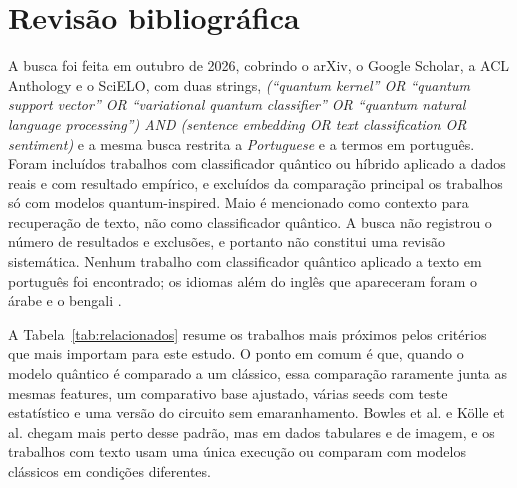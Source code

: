 \documentclass[conference]{IEEEtran}
\begin{document}
\section{Revisão bibliográfica}
\label{sec:revisao}

A busca foi feita em outubro de 2026, cobrindo o arXiv, o Google Scholar, a ACL Anthology e o SciELO, com duas strings, \textit{(``quantum kernel'' OR ``quantum support vector'' OR ``variational quantum classifier'' OR ``quantum natural language processing'') AND (sentence embedding OR text classification OR sentiment)} e a mesma busca restrita a \textit{Portuguese} e a termos em português. Foram incluídos trabalhos com classificador quântico ou híbrido aplicado a dados reais e com resultado empírico, e excluídos da comparação principal os trabalhos só com modelos quantum-inspired. Maio \cite{maio2026} é mencionado como contexto para recuperação de texto, não como classificador quântico. A busca não registrou o número de resultados e exclusões, e portanto não constitui uma revisão sistemática. Nenhum trabalho com classificador quântico aplicado a texto em português foi encontrado; os idiomas além do inglês que apareceram foram o árabe \cite{djemmal2025arabert} e o bengali \cite{masum2023}.

A Tabela~\ref{tab:relacionados} resume os trabalhos mais próximos pelos critérios que mais importam para este estudo. O ponto em comum é que, quando o modelo quântico é comparado a um clássico, essa comparação raramente junta as mesmas features, um comparativo base ajustado, várias seeds com teste estatístico e uma versão do circuito sem emaranhamento. Bowles et al. \cite{bowles2024} e Kölle et al. \cite{kolle2024} chegam mais perto desse padrão, mas em dados tabulares e de imagem, e os trabalhos com texto \cite{hassan2026,djemmal2025,masum2023} usam uma única execução ou comparam com modelos clássicos em condições diferentes.
\end{document}
